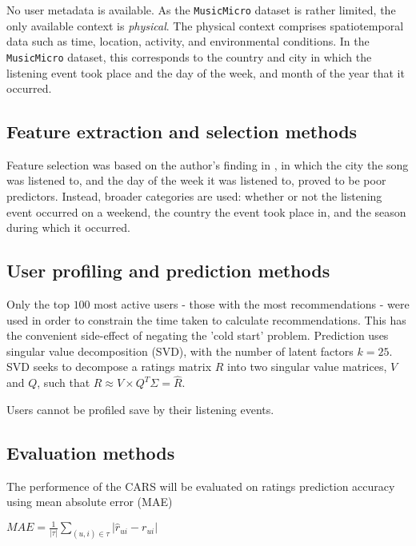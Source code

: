 \documentclass[conference]{IEEEtran}
\begin{document}
No user metadata is available. As the \verb|MusicMicro| dataset is rather limited, the only available context is \textit{physical}. The physical context comprises spatiotemporal data such as time, location, activity, and environmental conditions. In the \verb|MusicMicro| dataset, this corresponds to the country and city in which the listening event took place and the day of the week, and month of the year that it occurred.

\subsection{Feature extraction and selection methods}

Feature selection was based on the author's finding in \cite{schedl_2013}, in which the city the song was listened to, and the day of the week it was listened to, proved to be poor predictors. Instead, broader categories are used: whether or not the listening event occurred on a weekend, the country the event took place in, and the season during which it occurred. 

\subsection{User profiling and prediction methods}

Only the top $100$ most active users - those with the most recommendations - were used in order to constrain the time taken to calculate recommendations. This has the convenient side-effect of negating the 'cold start' problem. Prediction uses singular value decomposition (SVD), with the number of latent factors $k = 25$. SVD seeks to decompose a ratings matrix $R$ into two singular value matrices, $V$ and $Q$, such that $R \approx V \times Q^T \Sigma = \hat{R}$.

Users cannot be profiled save by their listening events.

\subsection{Evaluation methods}

The performence of the CARS will be evaluated on ratings prediction accuracy using mean absolute error (MAE)

\begin{center}

$MAE = \frac{1}{|\tau|} \sum_{(u, i) \in \tau} |\hat{r}_{ui} - r_{ui}|$

\end{center} 
\end{document}
